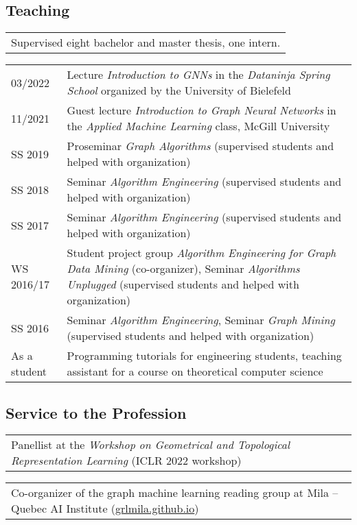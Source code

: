 \documentclass[11pt, a4paper, DIV=12]{scrartcl}
\begin{document}
\subsection*{Teaching}
\begin{tabular}{l}
Supervised eight bachelor and master thesis, one intern. \\[0.5em]
\end{tabular}

\begin{tabular}{p{2.1cm}p{12.0cm}}
03/2022	& Lecture \emph{Introduction to GNNs} in the \emph{Dataninja Spring School} organized by the University of Bielefeld\\
11/2021 & Guest lecture \emph{Introduction to Graph Neural Networks} in the \emph{Applied Machine Learning} class, McGill University\\	
SS 2019&Proseminar \emph{Graph Algorithms} (supervised students and helped with organization)\\
SS 2018&Seminar \emph{Algorithm Engineering} (supervised students and helped with organization)\\
SS 2017&Seminar \emph{Algorithm Engineering} (supervised students and helped with organization)\\
WS 2016/17&Student project group \emph{Algorithm Engineering for Graph Data Mining} (co-organizer), Seminar \emph{Algorithms Unplugged} (supervised students and helped with organization)\\
SS 2016& Seminar \emph{Algorithm Engineering}, Seminar \emph{Graph Mining} (supervised students and helped with organization)\\
As a student&Programming tutorials for engineering students, teaching assistant for a course on theoretical computer science\\
\end{tabular}

\subsection*{Service to the Profession}
\begin{tabular}{p{14.5cm}}	
	Panellist at the \emph{Workshop on
		Geometrical and Topological Representation Learning} (ICLR 2022 workshop) \\[0.5em]
\end{tabular}

\begin{tabular}{p{14.5cm}}
	Co-organizer of the graph machine learning reading group at Mila -- Quebec AI Institute (\url{grlmila.github.io}) \\[0.5em]	
\end{tabular}
\end{document}
